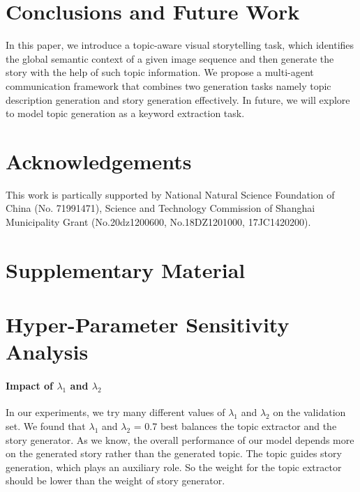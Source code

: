 \documentclass[11pt]{article}
\begin{document}
\section{Conclusions and Future Work}
In this paper, we introduce a topic-aware visual storytelling task, which identifies the global semantic context of a given image sequence and then generate the story with the help of such topic information. We propose a multi-agent communication framework that combines two generation tasks namely topic description generation and story generation effectively. In future, we will explore to model topic generation as a keyword extraction task.

\iffalse
For papers accepted to the main conference, we will invite authors to provide a translation 
of the title and abstract and a 1-2 page synopsis of the paper in a second 
language of the authors' choice. Appropriate languages include but are not 
limited to authors' native languages, languages spoken in the authors' place 
of affiliation, and languages that are the focus of the research presented.
\fi

\section*{Acknowledgements}
This work is partically supported by National Natural Science Foundation of China (No. 71991471), Science and Technology Commission of Shanghai Municipality Grant (No.20dz1200600, No.18DZ1201000, 17JC1420200).




\clearpage
\newpage
\appendix


\section*{Supplementary Material}
\label{sec:supp}






\section{Hyper-Parameter Sensitivity Analysis}
\label{parameter_analysis}
\paragraph{Impact of $\lambda_1$ and $\lambda_2$} In our experiments, we try many different values of $\lambda_1$ and $\lambda_2$ on the validation set. We found that $\lambda_1$ and $\lambda_2$ = 0.7 best balances the topic extractor and the story generator. As we know, the overall performance of our model depends more on the generated story rather than the generated topic. The topic guides story generation, which plays an auxiliary role. So the weight for the topic extractor should be lower than the weight of story generator.
\end{document}
